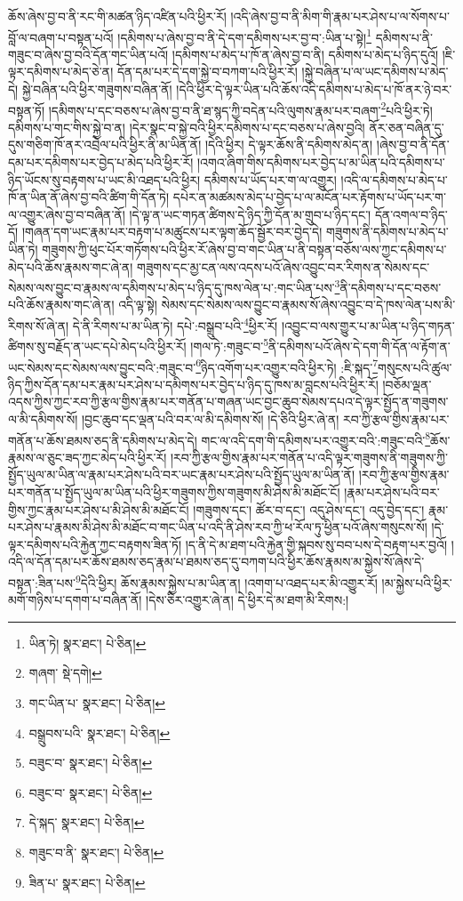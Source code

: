 ཆོས་ཞེས་བྱ་བ་ནི་རང་གི་མཚན་ཉིད་འཛིན་པའི་ཕྱིར་རོ། །འདི་ཞེས་བྱ་བ་ནི་མིག་གི་རྣམ་པར་ཤེས་པ་ལ་སོགས་པ་བློ་ལ་བཞག་པ་བསྟན་པའོ། །དམིགས་པ་ཞེས་བྱ་བ་ནི་དེ་དག་དམིགས་པར་བྱ་བ་:ཡིན་པ་སྟེ།\footnote{ཡིན་ཏེ།  སྣར་ཐང་།  པེ་ཅིན། } དམིགས་པ་ནི་གཟུང་བ་ཞེས་བྱ་བའི་དོན་གང་ཡིན་པའོ། །དམིགས་པ་མེད་པ་ཁོ་ན་ཞེས་བྱ་བ་ནི། དམིགས་པ་མེད་པ་ཉིད་དུའོ། །ཇི་ལྟར་དམིགས་པ་མེད་ཅེ་ན། དོན་དམ་པར་དེ་དག་སྐྱེ་བ་བཀག་པའི་ཕྱིར་རོ། །སྐྱེ་བཞིན་པ་ལ་ཡང་དམིགས་པ་མེད་དེ། སྐྱེ་བཞིན་པའི་ཕྱིར་གཟུགས་བཞིན་ནོ། །དེའི་ཕྱིར་དེ་ལྟར་ཡིན་པའི་ཆོས་འདི་དམིགས་པ་མེད་པ་ཁོ་ནར་ཉེ་བར་བསྟན་ཏོ། །དམིགས་པ་དང་བཅས་པ་ཞེས་བྱ་བ་ནི་ཐ་སྙད་ཀྱི་བདེན་པའི་ལུགས་རྣམ་པར་བཞག་\footnote{གཞག་  སྡེ་དགེ། }པའི་ཕྱིར་ཏེ། དམིགས་པ་གང་གིས་སྐྱེ་བ་ན། །དེར་སྣང་བ་སྐྱེ་བའི་ཕྱིར་དམིགས་པ་དང་བཅས་པ་ཞེས་བྱའི། ནོར་ཅན་བཞིན་དུ་དུས་གཅིག་ཁོ་ནར་འབྲེལ་པའི་ཕྱིར་ནི་མ་ཡིན་ནོ། །དེའི་ཕྱིར། དེ་ལྟར་ཆོས་ནི་དམིགས་མེད་ན། །ཞེས་བྱ་བ་ནི་དོན་དམ་པར་དམིགས་པར་བྱེད་པ་མེད་པའི་ཕྱིར་རོ། །འགའ་ཞིག་གིས་དམིགས་པར་བྱེད་པ་མ་ཡིན་པའི་དམིགས་པ་ཉིད་ཡོངས་སུ་བརྟགས་པ་ཡང་མི་འཐད་པའི་ཕྱིར། དམིགས་པ་ཡོད་པར་ག་ལ་འགྱུར། །འདི་ལ་དམིགས་པ་མེད་པ་ཁོ་ན་ཡིན་ནོ་ཞེས་བྱ་བའི་ཚིག་གི་དོན་ཏེ། དཔེར་ན་མཚམས་མེད་པ་བྱེད་པ་ལ་མངོན་པར་རྟོགས་པ་ཡོད་པར་ག་ལ་འགྱུར་ཞེས་བྱ་བ་བཞིན་ནོ། །དེ་ལྟ་ན་ཡང་གཏན་ཚིགས་དེ་ཉིད་ཀྱི་དོན་མ་གྲུབ་པ་ཉིད་དང་། དོན་འགལ་བ་ཉིད་དོ། །གཞན་དག་ཡང་རྣམ་པར་བརྟག་པ་མཚུངས་པར་ལྟག་ཆོད་སྦྱོར་བར་བྱེད་དེ། གཟུགས་ནི་དམིགས་པ་མེད་པ་ཡིན་ཏེ། གཟུགས་ཀྱི་ཕུང་པོར་གཏོགས་པའི་ཕྱིར་རོ་ཞེས་བྱ་བ་གང་ཡིན་པ་ནི་བསྟན་བཅོས་ལས་ཀྱང་དམིགས་པ་མེད་པའི་ཆོས་རྣམས་གང་ཞེ་ན། གཟུགས་དང་མྱ་ངན་ལས་འདས་པའོ་ཞེས་འབྱུང་བར་རིགས་ན་སེམས་དང་སེམས་ལས་བྱུང་བ་རྣམས་ལ་དམིགས་པ་མེད་པ་ཉིད་དུ་ཁས་ལེན་པ་:གང་ཡིན་པས་\footnote{གང་ཡིན་པ་  སྣར་ཐང་།  པེ་ཅིན། }ནི་དམིགས་པ་དང་བཅས་པའི་ཆོས་རྣམས་གང་ཞེ་ན། འདི་ལྟ་སྟེ། སེམས་དང་སེམས་ལས་བྱུང་བ་རྣམས་སོ་ཞེས་འབྱུང་བ་དེ་ཁས་ལེན་པས་མི་རིགས་སོ་ཞེ་ན། དེ་ནི་རིགས་པ་མ་ཡིན་ཏེ། དཔེ་:བསྒྲུབ་པའི་\footnote{བསྒྲུབས་པའི་  སྣར་ཐང་།  པེ་ཅིན། }ཕྱིར་རོ། །འབྱུང་བ་ལས་གྱུར་པ་མ་ཡིན་པ་ཉིད་གཏན་ཚིགས་སུ་བརྗོད་ན་ཡང་དཔེ་མེད་པའི་ཕྱིར་རོ། །གལ་ཏེ་:གཟུང་བ་\footnote{བཟུང་བ་  སྣར་ཐང་།  པེ་ཅིན། }ནི་དམིགས་པའོ་ཞེས་དེ་དག་གི་དོན་ལ་རྟོག་ན་ཡང་སེམས་དང་སེམས་ལས་བྱུང་བའི་:གཟུང་བ་\footnote{བཟུང་བ་  སྣར་ཐང་།  པེ་ཅིན། }ཉིད་འགོག་པར་འགྱུར་བའི་ཕྱིར་ཏེ། :ཇི་སྐད་\footnote{དེ་སྐད་  སྣར་ཐང་།  པེ་ཅིན། }གསུངས་པའི་ཚུལ་ཉིད་ཀྱིས་དོན་དམ་པར་རྣམ་པར་ཤེས་པ་དམིགས་པར་བྱེད་པ་ཉིད་དུ་ཁས་མ་བླངས་པའི་ཕྱིར་རོ། །བཅོམ་ལྡན་འདས་ཀྱིས་ཀྱང་རབ་ཀྱི་རྩལ་གྱིས་རྣམ་པར་གནོན་པ་གཞན་ཡང་བྱང་ཆུབ་སེམས་དཔའ་དེ་ལྟར་སྤྱོད་ན་གཟུགས་ལ་མི་དམིགས་སོ། །བྱང་ཆུབ་དང་ལྡན་པའི་བར་ལ་མི་དམིགས་སོ། །དེ་ཅིའི་ཕྱིར་ཞེ་ན། རབ་ཀྱི་རྩལ་གྱིས་རྣམ་པར་གནོན་པ་ཆོས་ཐམས་ཅད་ནི་དམིགས་པ་མེད་དེ། གང་ལ་འདི་དག་གི་དམིགས་པར་འགྱུར་བའི་:གཟུང་བའི་\footnote{གཟུང་བ་ནི་  སྣར་ཐང་།  པེ་ཅིན། }ཆོས་རྣམས་ལ་ཅུང་ཟད་ཀྱང་མེད་པའི་ཕྱིར་རོ། །རབ་ཀྱི་རྩལ་གྱིས་རྣམ་པར་གནོན་པ་འདི་ལྟར་གཟུགས་ནི་གཟུགས་ཀྱི་སྤྱོད་ཡུལ་མ་ཡིན་ལ་རྣམ་པར་ཤེས་པའི་བར་ཡང་རྣམ་པར་ཤེས་པའི་སྤྱོད་ཡུལ་མ་ཡིན་ནོ། །རབ་ཀྱི་རྩལ་གྱིས་རྣམ་པར་གནོན་པ་སྤྱོད་ཡུལ་མ་ཡིན་པའི་ཕྱིར་གཟུགས་ཀྱིས་གཟུགས་མི་ཤེས་མི་མཐོང་ངོ། །རྣམ་པར་ཤེས་པའི་བར་གྱིས་ཀྱང་རྣམ་པར་ཤེས་པ་མི་ཤེས་མི་མཐོང་ངོ། །གཟུགས་དང་། ཚོར་བ་དང་། འདུ་ཤེས་དང་། འདུ་བྱེད་དང་། རྣམ་པར་ཤེས་པ་རྣམས་མི་ཤེས་མི་མཐོང་བ་གང་ཡིན་པ་འདི་ནི་ཤེས་རབ་ཀྱི་ཕ་རོལ་ཏུ་ཕྱིན་པའོ་ཞེས་གསུངས་སོ། །དེ་ལྟར་དམིགས་པའི་རྐྱེན་ཀྱང་བརྟགས་ཟིན་ཏོ། །ད་ནི་དེ་མ་ཐག་པའི་རྐྱེན་གྱི་སྐབས་སུ་བབ་པས་དེ་བརྟག་པར་བྱའོ། །འདི་ལ་དོན་དམ་པར་ཆོས་ཐམས་ཅད་རྣམ་པ་ཐམས་ཅད་དུ་བཀག་པའི་ཕྱིར་ཆོས་རྣམས་མ་སྐྱེས་སོ་ཞེས་དེ་བསྟན་:ཟིན་པས་\footnote{ཟིན་པ་  སྣར་ཐང་།  པེ་ཅིན། }དེའི་ཕྱིར། ཆོས་རྣམས་སྐྱེས་པ་མ་ཡིན་ན། །འགག་པ་འཐད་པར་མི་འགྱུར་རོ། །མ་སྐྱེས་པའི་ཕྱིར་མགོ་གཉིས་པ་དགག་པ་བཞིན་ནོ། །དེས་ཅིར་འགྱུར་ཞེ་ན། དེ་ཕྱིར་དེ་མ་ཐག་མི་རིགས:། 